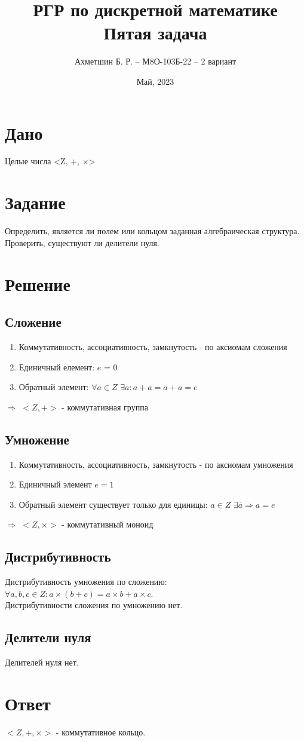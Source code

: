\documentclass{article}
\title{РГР по дискретной математике\\Пятая задача}
\author{Ахметшин Б. Р. -- М8О-103Б-22 -- 2 вариант}
\date{Май, 2023}
\begin{document}
\maketitle


\section*{Дано}
Целые числа <Z, +, $\times$>


\section*{Задание}
Определить, является ли полем или кольцом заданная алгебраическая структура.
Проверить, существуют ли делители нуля.

\section*{Решение}
\subsection*{Сложение}
\begin{enumerate}
    \item Коммутативность, ассоциативность, замкнутость - по аксиомам сложения
    \item Единичный елемент: $e$ = 0
    \item Обратный элемент: $\forall a \in Z$  $\exists \overline{a}: a + \overline{a} = \overline{a} + a = e$ 
\end{enumerate}
$\Rightarrow$ $<Z, +>$ - коммутативная группа

\subsection*{Умножение}
\begin{enumerate}
    \item Коммутативность, ассоциативность, замкнутость - по аксиомам умножения
    \item Единичный элемент $e = 1$
    \item Обратный элемент существует только для единицы: $a \in Z$  $\exists \overline{a} \Rightarrow a = e$
\end{enumerate}
$\Rightarrow$ $<Z, \times>$ - коммутативный моноид

\subsection*{Дистрибутивность}

Дистрибутивность умножения по сложению: $\forall a, b, c \in Z: a \times (b + c) = a \times b + a \times c$.\\
Дистрибутивности сложения по умножению нет.

\subsection*{Делители нуля}

Делителей нуля нет.

\section*{Ответ}

$<Z, +, \times>$ - коммутативное кольцо.
\end{document}
